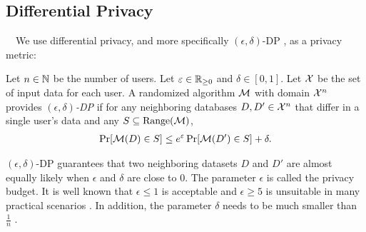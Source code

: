 \subsection{Differential Privacy}
\label{chap3-sub:privacy}
~~We use differential privacy, and more specifically $(\epsilon,\delta)$-DP \cite{DP}, as a privacy metric: 

\begin{definition}  \label{chap3-def:DP} 
Let $n \in \mathbb{N}$ be the number of users. 
Let $\varepsilon \in \mathbb{R}_{\ge0}$ and $\delta \in [0,1]$. 
Let $\mathcal{X}$ be the set of input data for each user. 
A randomized algorithm $\mathcal{M}$ with domain $\mathcal{X}^n$ 
provides \emph{$(\epsilon,\delta)$-DP} if for any neighboring databases $D,D' \in \mathcal{X}^n$ that differ in a single user's data and any 
$S \subseteq \mathrm{Range}(\mathcal{M})$, 
\begin{align*}
\Pr[\mathcal{M}(D) \in S] \leq e^\varepsilon \Pr[\mathcal{M}(D') \in S] + \delta.
\end{align*}
\end{definition}
$(\epsilon,\delta)$-DP guarantees that two neighboring datasets $D$ and $D'$ are almost equally likely when $\epsilon$ and $\delta$ are close to $0$. 
The parameter $\epsilon$ is called the privacy budget. 
It is well known that $\epsilon \leq 1$ is acceptable and $\epsilon \geq 5$ is unsuitable in many practical scenarios \cite{DP_Li}. 
In addition, the parameter $\delta$ needs to be much smaller than $\frac{1}{n}$ \cite{Barber_arXiv14,DP}. 

